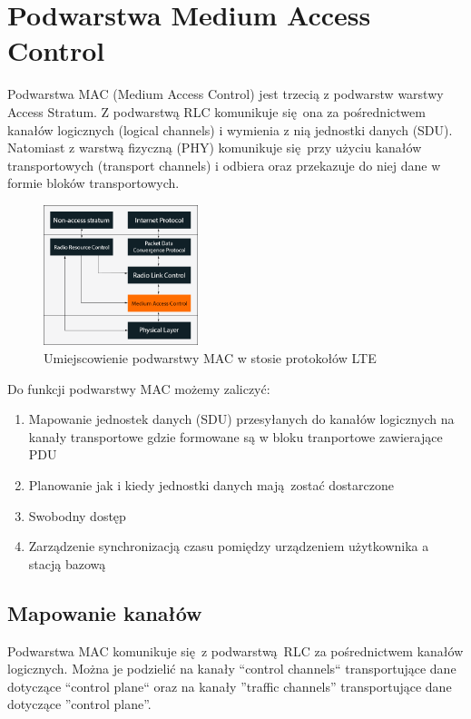 \chapter{Podwarstwa Medium Access Control}
\label{cha:mac}

Podwarstwa MAC (Medium Access Control) jest trzecią z podwarstw warstwy Access Stratum. Z podwarstwą RLC komunikuje się ona za pośrednictwem kanałów logicznych (logical channels) i wymienia z nią jednostki danych (SDU). Natomiast z warstwą fizyczną (PHY) komunikuje się przy użyciu kanałów transportowych (transport channels) i odbiera oraz przekazuje do niej dane w formie bloków transportowych.

\begin{figure}
	\centerline{\includegraphics[width=0.4\textwidth]{images/mac_overview.png}}
	\caption{Umiejscowienie podwarstwy MAC w stosie protokołów LTE}
	\label{fig:mac_overview}
\end{figure}

Do funkcji podwarstwy MAC możemy zaliczyć:

\begin{enumerate} 
	\item Mapowanie jednostek danych (SDU) przesyłanych do kanałów logicznych na kanały transportowe gdzie formowane są w bloku tranportowe zawierające PDU
	\item Planowanie jak i kiedy jednostki danych mają zostać dostarczone
	\item Swobodny dostęp
	\item Zarządzenie synchronizacją czasu pomiędzy urządzeniem użytkownika a stacją bazową 
\end{enumerate}


\section{Mapowanie kanałów}

Podwarstwa MAC komunikuje się z podwarstwą RLC za pośrednictwem kanałów logicznych. Można je podzielić na kanały ``control channels`` transportujące dane dotyczące ``control plane`` oraz na kanały ''traffic channels'' transportujące dane dotyczące ''control plane''.

